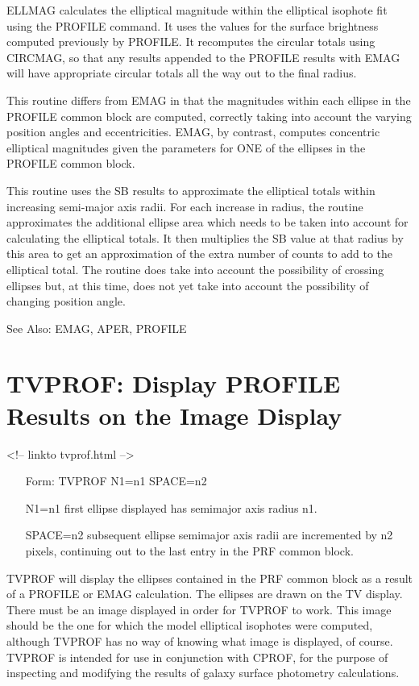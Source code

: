 ELLMAG calculates the elliptical magnitude within the elliptical isophote
fit using the PROFILE command.  It uses the values for the surface
brightness computed previously by PROFILE.  It recomputes the circular
totals using CIRCMAG, so that any results appended to the PROFILE results
with EMAG will have appropriate circular totals all the way out to the
final radius.

This routine differs from EMAG in that the magnitudes within each ellipse
in the PROFILE common block are computed, correctly taking into account the
varying position angles and eccentricities.  EMAG, by contrast, computes
concentric elliptical magnitudes given the parameters for ONE of the
ellipses in the PROFILE common block.

This routine uses the SB results to approximate the elliptical totals
within increasing semi-major axis radii.  For each increase in radius, the
routine approximates the additional ellipse area which needs to be taken
into account for calculating the elliptical totals.  It then multiplies the
SB value at that radius by this area to get an approximation of the extra
number of counts to add to the elliptical total.  The routine does take
into account the possibility of crossing ellipses but, at this time, does
not yet take into account the possibility of changing position angle.

See Also: EMAG, APER, PROFILE


\section{TVPROF: Display PROFILE Results on the Image Display}
\begin{rawhtml}
<!-- linkto tvprof.html -->
\end{rawhtml}
\begin{itemize}
  \item[Form: TVPROF N1=n1 SPACE=n2\hfill]{}
  \item[N1=n1]{first ellipse displayed has semimajor axis radius n1.}
  \item[SPACE=n2]{subsequent ellipse semimajor axis radii are incremented
       by n2 pixels, continuing out to the last entry in the PRF common
       block.}
\end{itemize}

TVPROF will display the ellipses contained in the PRF common block as a
result of a PROFILE or EMAG calculation. The ellipses are drawn on the TV
display. There must be an image displayed in order for TVPROF to work. This
image should be the one for which the model elliptical isophotes were
computed, although TVPROF has no way of knowing what image is displayed, of
course. TVPROF is intended for use in conjunction with CPROF, for the
purpose of inspecting and modifying the results of galaxy surface
photometry calculations.

